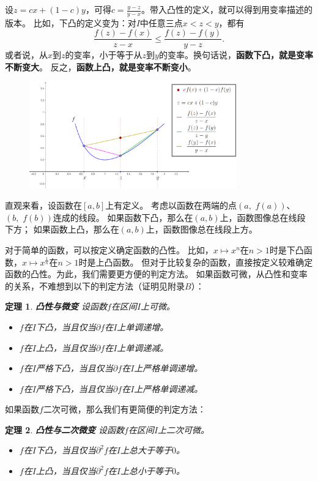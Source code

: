 \documentclass[12pt,UTF8]{ctexbook}
\newtheorem{tm}{定理}[section]
\begin{document}
设$z = cx + (1 - c)y$，可得$c = \frac{y - z}{y - x}$。带入凸性的定义，就可以得到用变率描述的版本。
比如，下凸的定义变为：对$I$中任意三点$x < z < y$，都有
$$ \frac{f(z) - f(x)}{z - x} \leqslant \frac{f(z) - f(y)}{y - z}. $$
或者说，从$x$到$z$的变率，小于等于从$z$到$y$的变率。换句话说，\textbf{函数下凸，就是变率不断变大}。
反之，\textbf{函数上凸，就是变率不断变小}。

\begin{figure}[h]
    \centering
    \includegraphics[width=0.8\textwidth]{tu/凸函数变率1.png}
\end{figure}

直观来看，设函数在$[a,b]$上有定义。
考虑以函数在两端的点$(a,\,\, f(a))$、$(b,\,\, f(b))$连成的线段。
如果函数下凸，那么在$(a,b)$上，函数图像总在线段下方；
如果函数上凸，那么在$(a,b)$上，函数图像总在线段上方。

对于简单的函数，可以按定义确定函数的凸性。
比如，$x\mapsto x^n$在$n>1$时是下凸函数，$x\mapsto x^\frac{1}{n}$在$n>1$时是上凸函数。
但对于比较复杂的函数，直接按定义较难确定函数的凸性。为此，我们需要更方便的判定方法。
如果函数可微，从凸性和变率的关系，不难想到以下的判定方法（证明见附录$B$）：

\begin{tm}{\textbf{凸性与微变}}
    设函数$f$在区间$I$上可微。
    \begin{itemize}
        \item $f$在$I$下凸，当且仅当$\partial f$在$I$上单调递增。
        \item $f$在$I$上凸，当且仅当$\partial f$在$I$上单调递减。
        \item $f$在$I$严格下凸，当且仅当$\partial f$在$I$上严格单调递增。
        \item $f$在$I$严格下凸，当且仅当$\partial f$在$I$上严格单调递减。
    \end{itemize}
\end{tm}

如果函数$f$二次可微，那么我们有更简便的判定方法：
\begin{tm}\textbf{凸性与二次微变}
    设函数$f$在区间$I$上二次可微。
    \begin{itemize}
        \item $f$在$I$下凸，当且仅当$\partial^2 f$在$I$上总大于等于$0$。
        \item $f$在$I$上凸，当且仅当$\partial^2 f$在$I$上总小于等于$0$。
    \end{itemize}
\end{tm}
\end{document}
